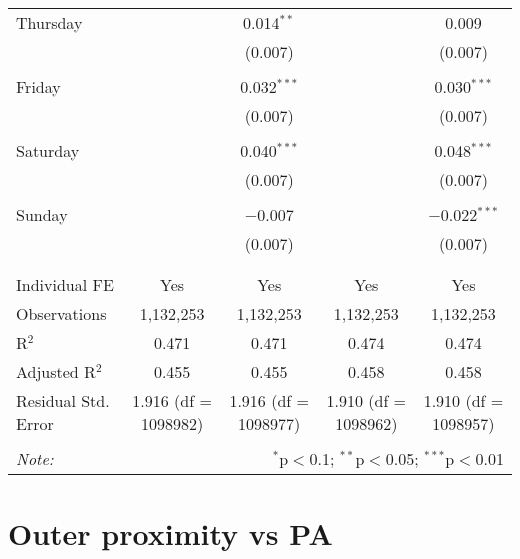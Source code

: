 \documentclass[
]{article}
\begin{document}
\begin{table}[!htbp]
{\begin{tabular}{@{\extracolsep{5pt}}lcccc}
 Thursday &  & 0.014$^{**}$ &  & 0.009 \\ 
  &  & (0.007) &  & (0.007) \\ 
  & & & & \\ 
 Friday &  & 0.032$^{***}$ &  & 0.030$^{***}$ \\ 
  &  & (0.007) &  & (0.007) \\ 
  & & & & \\ 
 Saturday &  & 0.040$^{***}$ &  & 0.048$^{***}$ \\ 
  &  & (0.007) &  & (0.007) \\ 
  & & & & \\ 
 Sunday &  & $-$0.007 &  & $-$0.022$^{***}$ \\ 
  &  & (0.007) &  & (0.007) \\ 
  & & & & \\ 
\hline \\[-1.8ex] 
Individual FE & Yes & Yes & Yes & Yes \\ 
Observations & 1,132,253 & 1,132,253 & 1,132,253 & 1,132,253 \\ 
R$^{2}$ & 0.471 & 0.471 & 0.474 & 0.474 \\ 
Adjusted R$^{2}$ & 0.455 & 0.455 & 0.458 & 0.458 \\ 
Residual Std. Error & 1.916 (df = 1098982) & 1.916 (df = 1098977) & 1.910 (df = 1098962) & 1.910 (df = 1098957) \\ 
\hline 
\hline \\[-1.8ex] 
\textit{Note:}  & \multicolumn{4}{r}{$^{*}$p$<$0.1; $^{**}$p$<$0.05; $^{***}$p$<$0.01} \\ 
\end{tabular}
} 
\end{table} 
\newpage
\section{Outer proximity vs PA}
\end{document}
